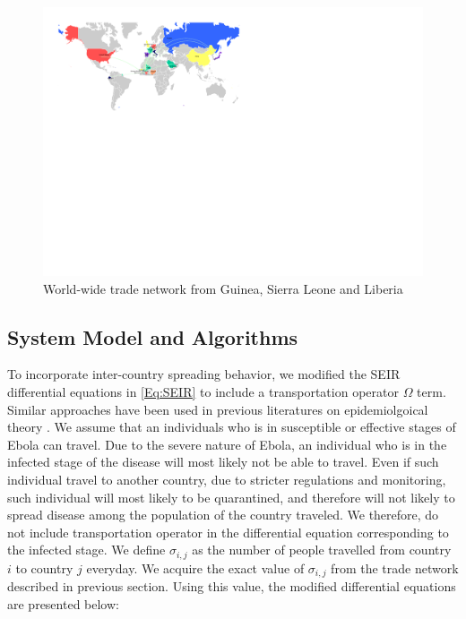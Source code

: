 \documentclass[10pt, journal,onecolumn]{IEEEtran}
\begin{document}
\begin{figure}[ht]
\centering
\includegraphics[scale=1.1]{world1.pdf}
\caption{World-wide trade network from Guinea, Sierra Leone and Liberia}
\label{Fig:worldtrade}
\end{figure}


\subsection{{System Model and Algorithms}}
\label{SubSec:WorldSystem}

To incorporate inter-country spreading behavior, we modified the SEIR differential equations in \eqref{Eq:SEIR} to include a transportation operator $\Omega$ term. Similar approaches have been used in previous literatures on epidemiolgoical theory \citep{grais2003assessing, balcan2010modeling}. We assume that an individuals who is in susceptible or effective stages of Ebola can travel. Due to the severe nature of Ebola, an individual who is in the infected stage of the disease will most likely not be able to travel. Even if such individual travel to another country, due to stricter regulations and monitoring, such individual will most likely to be quarantined, and therefore will not likely to spread disease among the population of the country traveled. We therefore, do not  include transportation operator in the differential equation corresponding to the infected stage. We define $\sigma_{i,j}$ as the number of people travelled from country $i$ to country $j$ everyday. We acquire the exact value of  $\sigma_{i,j}$ from the trade network described in previous section.  Using this value, the modified differential equations are presented below:
\end{document}
